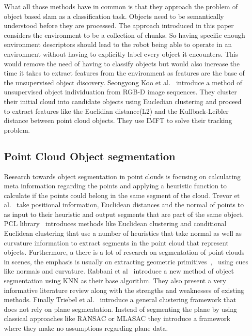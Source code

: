 \documentclass[twoside,hidelinks]{article}
\begin{document}
What all those methods have in common is that they approach the problem of object based slam as a classification task. Objects need to be semantically understood before they are processed. The approach introduced in this paper considers the environment to be a collection of chunks. So having specific enough environment descriptors should lead to the robot being able to operate in an environment without having to explicitly label every object it encounters. This would remove the need of having to classify objects but would also increase the time it takes to extract features from the environment as features are the base of the unsupervised object discovery.
Seongyong Koo et al.~\cite{objectDisc} introduce a method of unsupervised object individuation from RGB-D image sequences. They cluster their initial cloud into candidate objects using Eucledian clustering and proceed to extract features like the Euclidian distance(L2) and the Kullback-Leibler distance between point cloud objects. They use IMFT to solve their tracking problem.

\subsection{Point Cloud Object segmentation}

Research towards object segmentation in point clouds is focusing on calculating meta information regarding the points and applying a heuristic function to calculate if the points could belong in the same segment of the cloud. Trevor et al.~\cite{pointSeg} take positional information, Euclidean distances and the normal of points to as input to their heuristic and output segments that are part of the same object. PCL library~\cite{pcl} introduces methods like Euclidean clustering and conditional Euclidean clustering that use a number of heuristics that take normal as well as curvature information to extract segments in the point cloud that represent objects. Furthermore, a there is a lot of research on segmentation of point clouds in scenes, the emphasis is usually on extracting geometric primitives~\cite{planarSeg},~\cite{planarSeg2} using cues like normals and curvature. Rabbani et al~\cite{segOverview} introduce a new method of object segmentation using KNN as their base algorithm. They also present a very informative literature review along with the strengths and weaknesses of existing methods. Finally Triebel et al.~\cite{smartSeg} introduce a general clustering framework that does not rely on plane segmentation. Instead of segmenting the plane by using classical approaches like RANSAC or MLASAC they introduce a framework where they make no assumptions regarding plane data. 
\end{document}
